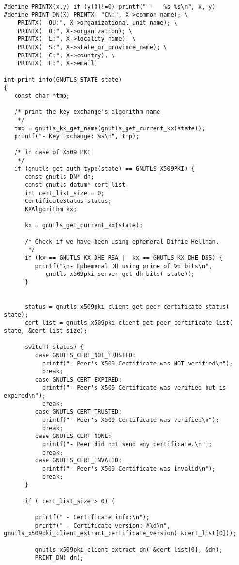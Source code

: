 \begin{verbatim}

#define PRINTX(x,y) if (y[0]!=0) printf(" -   %s %s\n", x, y)
#define PRINT_DN(X) PRINTX( "CN:", X->common_name); \
	PRINTX( "OU:", X->organizational_unit_name); \
	PRINTX( "O:", X->organization); \
	PRINTX( "L:", X->locality_name); \
	PRINTX( "S:", X->state_or_province_name); \
	PRINTX( "C:", X->country); \
	PRINTX( "E:", X->email)

int print_info(GNUTLS_STATE state)
{
   const char *tmp;

   /* print the key exchange's algorithm name
    */
   tmp = gnutls_kx_get_name(gnutls_get_current_kx(state));
   printf("- Key Exchange: %s\n", tmp);

   /* in case of X509 PKI
    */
   if (gnutls_get_auth_type(state) == GNUTLS_X509PKI) {
      const gnutls_DN* dn;
      const gnutls_datum* cert_list;
      int cert_list_size = 0;
      CertificateStatus status;
      KXAlgorithm kx;

      kx = gnutls_get_current_kx(state);

      /* Check if we have been using ephemeral Diffie Hellman.
       */
      if (kx == GNUTLS_KX_DHE_RSA || kx == GNUTLS_KX_DHE_DSS) {
         printf("\n- Ephemeral DH using prime of %d bits\n",
            gnutls_x509pki_server_get_dh_bits( state));
      }


      status = gnutls_x509pki_client_get_peer_certificate_status( state);
      cert_list = gnutls_x509pki_client_get_peer_certificate_list( state, &cert_list_size);

      switch( status) {
         case GNUTLS_CERT_NOT_TRUSTED:
           printf("- Peer's X509 Certificate was NOT verified\n");
           break;
         case GNUTLS_CERT_EXPIRED:
           printf("- Peer's X509 Certificate was verified but is expired\n");
           break;
         case GNUTLS_CERT_TRUSTED:
           printf("- Peer's X509 Certificate was verified\n");
           break;
         case GNUTLS_CERT_NONE:
           printf("- Peer did not send any certificate.\n");
           break;
         case GNUTLS_CERT_INVALID:
           printf("- Peer's X509 Certificate was invalid\n");
           break;
      }
		
      if ( cert_list_size > 0) {

         printf(" - Certificate info:\n");
         printf(" - Certificate version: #%d\n", gnutls_x509pki_client_extract_certificate_version( &cert_list[0]));

         gnutls_x509pki_client_extract_dn( &cert_list[0], &dn);
         PRINT_DN( dn);


\end{verbatim}
